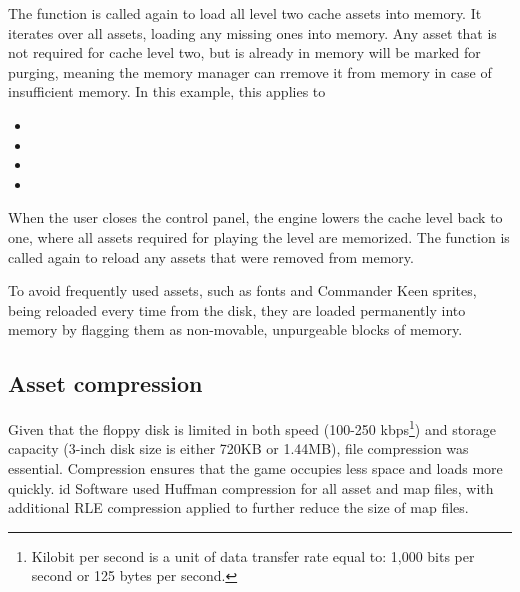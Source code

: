 \documentclass[book.tex]{subfiles}
\begin{document}
\par
The function  is called again to load all level two cache assets into memory. It iterates over all assets, loading any missing ones into memory. Any asset that is not required for cache level two, but is already in memory will be marked for purging, meaning the memory manager can rremove it from memory in case of insufficient memory. In this example, this applies to 
\begin{itemize}
  \item {}
  \item {}
  \item {} 
  \item {}
\end{itemize}



\pagebreak


\par
When the user closes the control panel, the engine lowers the cache level back to one, where all assets required for playing the level are memorized. The function  is called again to reload any assets that were removed from memory.\\

\par

\par
To avoid frequently used assets, such as fonts and Commander Keen sprites, being reloaded every time from the disk, they are loaded permanently into memory by flagging them as non-movable, unpurgeable blocks of memory. \\

\par

\par
 

\subsection{Asset compression}
Given that the floppy disk is limited in both speed (100-250 kbps\footnote{Kilobit per second is a unit of data transfer rate equal to: 1,000 bits per second or 125 bytes per second.}) and storage capacity (3-inch disk size is either 720KB or 1.44MB), file compression was essential. Compression ensures that the game occupies less space and loads more quickly. id Software used Huffman compression for all asset and map files, with additional RLE compression applied to further reduce the size of map files.
\end{document}
